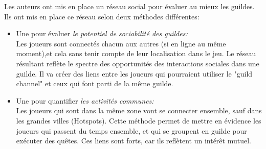 \par Les auteurs ont mis en place un réseau social pour évaluer au mieux les guildes. Ils ont mis en place ce réseau selon deux méthodes différentes:
\begin{itemize}
	\renewcommand{\labelitemi}{$\bullet$}
	\item Une pour évaluer \textit{le potentiel de sociabilité des guildes:}\\
	Les joueurs sont connectés chacun aux autres (si en ligne au même moment),et cela sans tenir compte de leur localisation dans le jeu. Le réseau résultant reflète le spectre des opportunités des interactions sociales dans une guilde. Il va créer des liens entre les joueurs qui pourraient utiliser le "guild channel" et ceux qui font parti de la même guilde.
	\item Une pour quantifier \textit{les activités communes:}\\
	Les joueurs qui sont dans la même zone vont se connecter ensemble, sauf dans les grandes villes (Hotspots). Cette méthode permet de mettre en évidence les joueurs qui passent du temps ensemble, et qui se groupent en guilde pour exécuter des quêtes. Ces liens sont forts, car ils reflètent un intérêt mutuel. 
\end{itemize}

